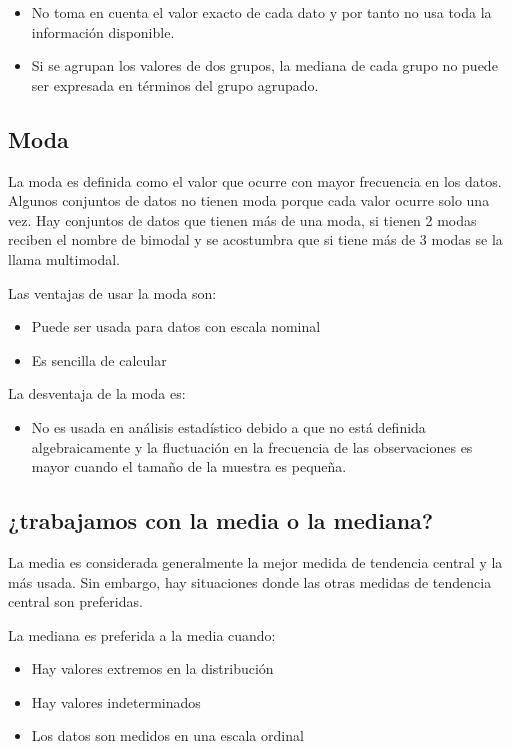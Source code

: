 \documentclass[]{book}
\providecommand{\tightlist}{%
  \setlength{\itemsep}{0pt}\setlength{\parskip}{0pt}}
\begin{document}
\begin{itemize}
\tightlist
\item
  No toma en cuenta el valor exacto de cada dato y por tanto no usa toda
  la información disponible.
\item
  Si se agrupan los valores de dos grupos, la mediana de cada grupo no
  puede ser expresada en términos del grupo agrupado.
\end{itemize}

\subsection{Moda}\label{moda}

La moda es definida como el valor que ocurre con mayor frecuencia en los
datos. Algunos conjuntos de datos no tienen moda porque cada valor
ocurre solo una vez. Hay conjuntos de datos que tienen más de una moda,
si tienen 2 modas reciben el nombre de bimodal y se acostumbra que si
tiene más de 3 modas se la llama multimodal.

Las ventajas de usar la moda son:

\begin{itemize}
\tightlist
\item
  Puede ser usada para datos con escala nominal
\item
  Es sencilla de calcular
\end{itemize}

La desventaja de la moda es:

\begin{itemize}
\tightlist
\item
  No es usada en análisis estadístico debido a que no está definida
  algebraicamente y la fluctuación en la frecuencia de las observaciones
  es mayor cuando el tamaño de la muestra es pequeña.
\end{itemize}

\subsection{¿trabajamos con la media o la
mediana?}\label{trabajamos-con-la-media-o-la-mediana}

La media es considerada generalmente la mejor medida de tendencia
central y la más usada. Sin embargo, hay situaciones donde las otras
medidas de tendencia central son preferidas.

La mediana es preferida a la media cuando:

\begin{itemize}
\tightlist
\item
  Hay valores extremos en la distribución
\item
  Hay valores indeterminados
\item
  Los datos son medidos en una escala ordinal
\end{itemize}
\end{document}
